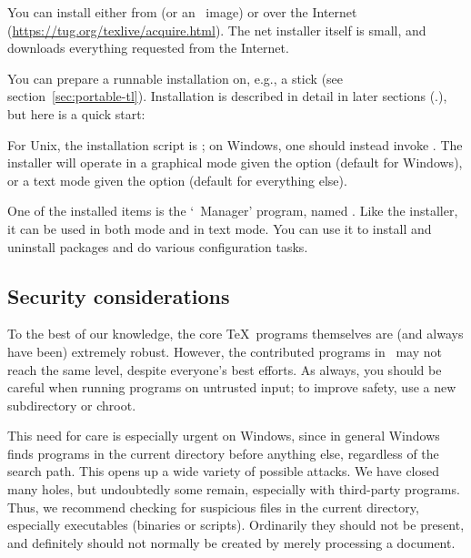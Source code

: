 \documentclass[12pt]{article}
\begin{document}
You can install \TL{} either from \DVD{} (or an \ISO\ image) or over the
Internet (\url{https://tug.org/texlive/acquire.html}). The net installer
itself is small, and downloads everything requested from the Internet.

You can prepare a runnable installation on, e.g., a \USB{} stick (see
section~\ref{sec:portable-tl}). Installation is described in detail in
later sections (\p.\pageref{sec:install}), but here is a quick start:

\begin{itemize*}

\item For Unix, the installation script is ; on
  Windows, one should instead invoke .
  The installer will operate in a graphical mode given the option
   (default for Windows), or a text mode given
  the option  (default for everything else).

\item One of the installed items is the `\TL\ Manager' program,
  named .  Like the installer, it can be used in both \GUI{}
  mode and in text mode. You can use it to install and uninstall
  packages and do various configuration tasks.

\end{itemize*}


\subsection{Security considerations}
\label{sec:security}

To the best of our knowledge, the core \TeX\ programs themselves are
(and always have been) extremely robust.  However, the contributed
programs in \TL\ may not reach the same level, despite everyone's
best efforts.  As always, you should be careful when running programs on
untrusted input; to improve safety, use a new subdirectory or chroot.

This need for care is especially urgent on Windows, since in general
Windows finds programs in the current directory before anything else,
regardless of the search path.  This opens up a wide variety of possible
attacks.  We have closed many holes, but undoubtedly some remain,
especially with third-party programs.  Thus, we recommend checking for
suspicious files in the current directory, especially executables
(binaries or scripts).  Ordinarily they should not be present, and
definitely should not normally be created by merely processing a document.
\end{document}
